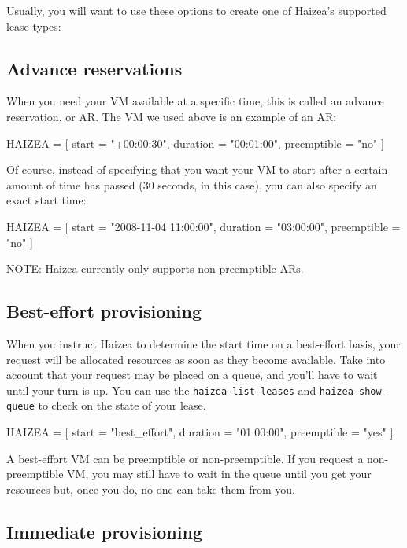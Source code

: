Usually, you will want to use these options to create one of Haizea's supported lease types:

\subsection{Advance reservations}

When you need your VM available at a specific time, this is called an advance reservation, or AR. The VM we used above is an example of an AR:

\begin{wideshellverbatim}
HAIZEA = [
  start        = "+00:00:30",
  duration     = "00:01:00",
  preemptible  = "no"
]
\end{wideshellverbatim}

Of course, instead of specifying that you want your VM to start after a certain amount of time has passed (30 seconds, in this case), you can also specify an exact start time:

\begin{wideshellverbatim}
HAIZEA = [
  start        = "2008-11-04 11:00:00",
  duration     = "03:00:00",
  preemptible  = "no"
]
\end{wideshellverbatim}

NOTE: Haizea currently only supports non-preemptible ARs.

\subsection{Best-effort provisioning}

When you instruct Haizea to determine the start time on a best-effort basis, your request will be allocated resources as soon as they become available. Take into account that your request may be placed on a queue, and you'll have to wait until your turn is up. You can use the \texttt{haizea-list-leases} and \texttt{haizea-show-queue} to check on the state of your lease.

\begin{wideshellverbatim}
HAIZEA = [
  start        = "best_effort",
  duration     = "01:00:00",
  preemptible  = "yes"
]
\end{wideshellverbatim}

A best-effort VM can be preemptible or non-preemptible. If you request a non-preemptible VM, you may still have to wait in the queue until you get your resources but, once you do, no one can take them from you.

\subsection{Immediate provisioning}

